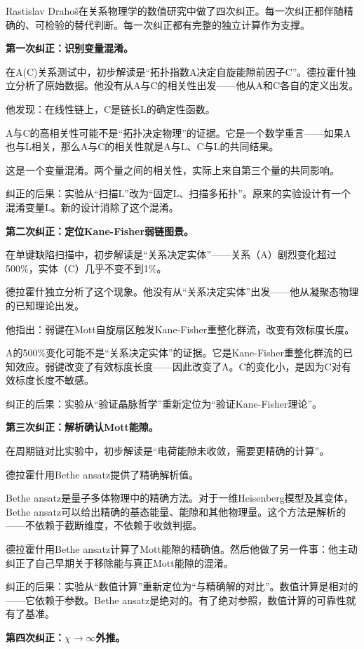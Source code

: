 \documentclass[11pt,a4paper]{book}
\theoremstyle{definition}
\begin{document}
Rastislav Drahoš在关系物理学的数值研究中做了四次纠正。每一次纠正都伴随精确的、可检验的替代判断。每一次纠正都有完整的独立计算作为支撑。

\textbf{第一次纠正：识别变量混淆。}

在A(C)关系测试中，初步解读是“拓扑指数A决定自旋能隙前因子C”。德拉霍什独立分析了原始数据。他没有从A与C的相关性出发——他从A和C各自的定义出发。

他发现：在线性链上，C是链长L的确定性函数。

A与C的高相关性可能不是“拓扑决定物理”的证据。它是一个数学重言——如果A也与L相关，那么A与C的相关性就是A与L、C与L的共同结果。

这是一个变量混淆。两个量之间的相关性，实际上来自第三个量的共同影响。

纠正的后果：实验从“扫描L”改为“固定L、扫描多拓扑”。原来的实验设计有一个混淆变量L。新的设计消除了这个混淆。

\textbf{第二次纠正：定位Kane-Fisher弱链图景。}

在单键缺陷扫描中，初步解读是“关系决定实体”——关系（A）剧烈变化超过500\%，实体（C）几乎不变不到1\%。

德拉霍什独立分析了这个现象。他没有从“关系决定实体”出发——他从凝聚态物理的已知理论出发。

他指出：弱键在Mott自旋扇区触发Kane-Fisher重整化群流，改变有效标度长度。

A的500\%变化可能不是“关系决定实体”的证据。它是Kane-Fisher重整化群流的已知效应。弱键改变了有效标度长度——因此改变了A。C的变化小，是因为C对有效标度长度不敏感。

纠正的后果：实验从“验证晶脉哲学”重新定位为“验证Kane-Fisher理论”。

\textbf{第三次纠正：解析确认Mott能隙。}

在周期链对比实验中，初步解读是“电荷能隙未收敛，需要更精确的计算”。

德拉霍什用Bethe ansatz提供了精确解析值。

Bethe ansatz是量子多体物理中的精确方法。对于一维Heisenberg模型及其变体，Bethe ansatz可以给出精确的基态能量、能隙和其他物理量。这个方法是解析的——不依赖于截断维度，不依赖于收敛判据。

德拉霍什用Bethe ansatz计算了Mott能隙的精确值。然后他做了另一件事：他主动纠正了自己早期关于移除能与真正Mott能隙的混淆。

纠正的后果：实验从“数值计算”重新定位为“与精确解的对比”。数值计算是相对的——它依赖于参数。Bethe ansatz是绝对的。有了绝对参照，数值计算的可靠性就有了基准。

\textbf{第四次纠正：$\chi\to\infty$外推。}
\end{document}
